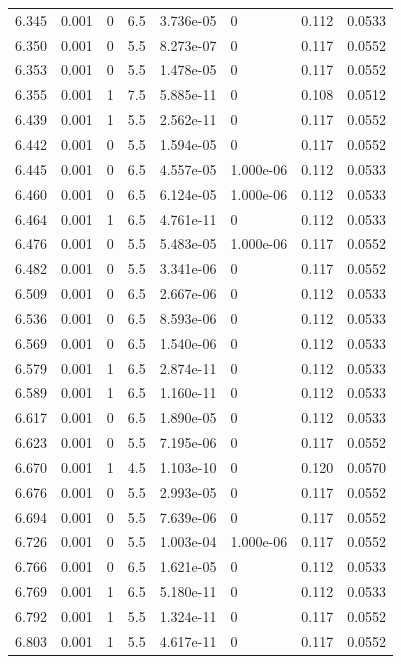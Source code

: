 \documentclass[preview]{standalone}
\begin{document}
{{{{{{{\begin{tabular}{L{1.2cm}C{1.2cm} C{0.3cm}C{0.5cm} C{1.4cm}C{1.4cm} C{1.4cm}C{1.4cm}}
  6.345  &  0.001  & 0     & 6.5 &  3.736e-05  & 0  & 0.112 &  0.0533   \\ 
  6.350  &  0.001  & 0     & 5.5 &  8.273e-07  & 0  & 0.117 &  0.0552   \\ 
  6.353  &  0.001  & 0     & 5.5 &  1.478e-05  & 0  & 0.117 &  0.0552   \\ 
  6.355  &  0.001  & 1     & 7.5 &  5.885e-11  & 0  & 0.108 &  0.0512   \\ 
  6.439  &  0.001  & 1     & 5.5 &  2.562e-11  & 0  & 0.117 &  0.0552   \\ 
  6.442  &  0.001  & 0     & 5.5 &  1.594e-05  & 0  & 0.117 &  0.0552   \\ 
  6.445  &  0.001  & 0     & 6.5 &  4.557e-05  & 1.000e-06  & 0.112 &  0.0533   \\ 
  6.460  &  0.001  & 0     & 6.5 &  6.124e-05  & 1.000e-06  & 0.112 &  0.0533   \\ 
  6.464  &  0.001  & 1     & 6.5 &  4.761e-11  & 0  & 0.112 &  0.0533   \\ 
  6.476  &  0.001  & 0     & 5.5 &  5.483e-05  & 1.000e-06  & 0.117 &  0.0552   \\ 
  6.482  &  0.001  & 0     & 5.5 &  3.341e-06  & 0  & 0.117 &  0.0552   \\ 
  6.509  &  0.001  & 0     & 6.5 &  2.667e-06  & 0  & 0.112 &  0.0533   \\ 
  6.536  &  0.001  & 0     & 6.5 &  8.593e-06  & 0  & 0.112 &  0.0533   \\ 
  6.569  &  0.001  & 0     & 6.5 &  1.540e-06  & 0  & 0.112 &  0.0533   \\ 
  6.579  &  0.001  & 1     & 6.5 &  2.874e-11  & 0  & 0.112 &  0.0533   \\ 
  6.589  &  0.001  & 1     & 6.5 &  1.160e-11  & 0  & 0.112 &  0.0533   \\ 
  6.617  &  0.001  & 0     & 6.5 &  1.890e-05  & 0  & 0.112 &  0.0533   \\ 
  6.623  &  0.001  & 0     & 5.5 &  7.195e-06  & 0  & 0.117 &  0.0552   \\ 
  6.670  &  0.001  & 1     & 4.5 &  1.103e-10  & 0  & 0.120 &  0.0570   \\ 
  6.676  &  0.001  & 0     & 5.5 &  2.993e-05  & 0  & 0.117 &  0.0552   \\ 
  6.694  &  0.001  & 0     & 5.5 &  7.639e-06  & 0  & 0.117 &  0.0552   \\ 
  6.726  &  0.001  & 0     & 5.5 &  1.003e-04  & 1.000e-06  & 0.117 &  0.0552   \\ 
  6.766  &  0.001  & 0     & 6.5 &  1.621e-05  & 0  & 0.112 &  0.0533   \\ 
  6.769  &  0.001  & 1     & 6.5 &  5.180e-11  & 0  & 0.112 &  0.0533   \\ 
  6.792  &  0.001  & 1     & 5.5 &  1.324e-11  & 0  & 0.117 &  0.0552   \\ 
  6.803  &  0.001  & 1     & 5.5 &  4.617e-11  & 0  & 0.117 &  0.0552   \\ 
\hline 
\end{tabular} 

}}}}}}}
\end{document}
